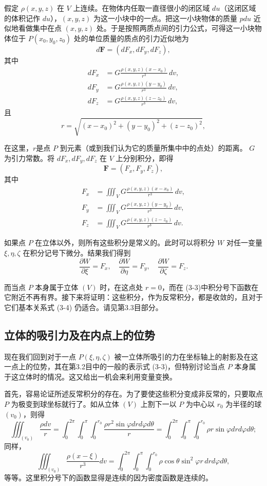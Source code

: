 \documentclass[12pt]{ctexart}
\begin{document}
假定 $\rho(x, y, z)$ 在 $V$ 上连续。在物体内任取一直径很小的闭区域 $du$（这闭区域的体积记作 $du$），$(x, y, z)$ 为这一小块中的一点。把这一小块物体的质量 $pdu$ 近似地看做集中在点 $(x, y, z)$ 处。于是按照两质点间的引力公式，可得这一小块物体位于 $P(x_0, y_0, z_0)$ 处的单位质量的质点的引力近似地为
\[
d\mathbf{F} = (dF_x, dF_y, dF_z),
\]
其中
\begin{align*}
dF_x &= G \frac{\rho(x, y, z)(x - x_0)}{r^3} \, dv, \\
dF_y &= G \frac{\rho(x, y, z)(y - y_0)}{r^3} \, dv, \\
dF_z &= G \frac{\rho(x, y, z)(z - z_0)}{r^3} \, dv,
\end{align*}
且
\[
r = \sqrt{(x - x_0)^2 + (y - y_0)^2 + (z - z_0)^2},
\]

在这里，$r$是点 $P$ 到元素（或到我们认为它的质量所集中中的点处）的距离。
$G$ 为引力常数。将 $dF_x, dF_y, dF_z$ 在 $V$ 上分别积分，即得
\[
\mathbf{F} = (F_x, F_y, F_z),
\]
其中
\begin{align*}
F_x &= \iiint_V G \frac{\rho(x, y, z)(x - x_0)}{r^3} \, dv, \\
F_y &= \iiint_V G \frac{\rho(x, y, z)(y - y_0)}{r^3} \, dv, \\
F_z &= \iiint_V G \frac{\rho(x, y, z)(z - z_0)}{r^3} \, dv.
\tag{3-3}
\end{align*}

如果点 $P$ 在立体以外，则所有这些积分是常义的。此时可以将积分 $W$ 对任一变量 $\xi, \eta, \zeta$ 在积分记号下微分。结果我们得到
\[
\frac{\partial W}{\partial \xi} = F_x, \quad \frac{\partial W}{\partial \eta} = F_y, \quad \frac{\partial W}{\partial \zeta} = F_z. \tag{3-4}
\]

而当点 $P$ 本身属于立体 $(V)$ 时，在这点处 $r = 0$，而在 (3-3)中积分号下函数在它附近不再有界。接下来将证明：这些积分，作为反常积分，都是收敛的，且对于它们基本关系式 (3-4) 仍适合。\cite{key9}请见第3.3目部分。

\subsection{立体的吸引力及在内点上的位势}
现在我们回到对于一点 $P(\xi, \eta, \zeta)$ 被一立体所吸引的力在坐标轴上的射影及在这一点上的位势，其在第3.2目中的一般的表示式 (3-3)，但特别讨论当点 $P$ 本身属于这立体时的情况。这又给出一机会来利用变量变换。\cite{key11}

首先，容易论证所述反常积分的存在。为了要使这些积分变成非反常的，只要取点 $P$ 为极变到球坐标就行了。如从立体 $(V)$ 上割下一以 $P$ 为中心以 $r_0$ 为半径的球 $(v_0)$，则得
\[
\iiint_{(v_0)} \frac{\rho dv}{r} = \int_0^{2\pi} \int_0^{\pi} \int_0^{r_0} \frac{\rho r^2 \sin \varphi dr d\varphi d\theta}{r} = \int_0^{2\pi} \int_0^{\pi} \int_0^{r_0} \rho r \sin \varphi dr d\varphi d\theta;
\]
同样，
\[
\iiint_{(v_0)} \frac{\rho(x - \xi)}{r^3} dv = \int_0^{2\pi} \int_0^{\pi} \int_0^{r_0} \rho \cos \theta \sin^2 \varphi r \, dr d\varphi d\theta,
\]
等等。这里积分号下的函数显得是连续的因为密度函数是连续的。
\end{document}
